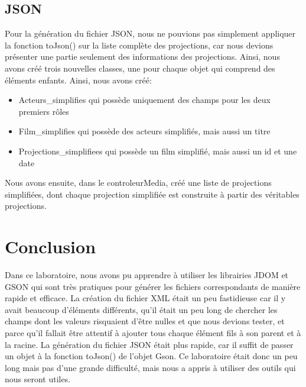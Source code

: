 \documentclass[a4paper]{article} %
\begin{document}
\subsection{JSON}
Pour la génération du fichier JSON, nous ne pouvions pas simplement appliquer la fonction toJson() sur la liste complète des projections, car nous devions présenter une partie seulement des informations des projections. Ainsi, nous avons créé trois nouvelles classes, une pour chaque objet qui comprend des éléments enfants. Ainsi, nous avons créé:
\begin{itemize}
	\item{Acteurs\_simplifies} qui possède uniquement des champs pour les deux premiers rôles
	\item{Film\_simplifies} qui possède des acteurs simplifiés, mais aussi un titre
	\item{Projections\_simplifiees} qui possède un film simplifié, mais aussi un id et une date
\end{itemize}

Nous avons ensuite, dans le controleurMedia, créé une liste de projections simplifiées, dont chaque projection simplifiée est construite à partir des véritables projections.
\section{Conclusion}
 
Dans ce laboratoire, nous avons pu apprendre à utiliser les librairies JDOM et GSON qui sont très pratiques pour générer les fichiers correspondants de manière rapide et efficace. La création du fichier XML était un peu fastidieuse car il y avait beaucoup d'éléments différents, qu'il était un peu long de chercher les champs dont les valeurs risquaient d'être nulles et que nous devions tester, et parce qu'il fallait être attentif à ajouter tous chaque élément fils à son parent et à la racine. La génération du fichier JSON était plus rapide, car il suffit de passer un objet à la fonction toJson() de l'objet Gson. Ce laboratoire était donc un peu long mais pas d'une grande difficulté, mais nous a appris à utiliser des outils qui nous seront utiles.
\pagebreak
\end{document}
